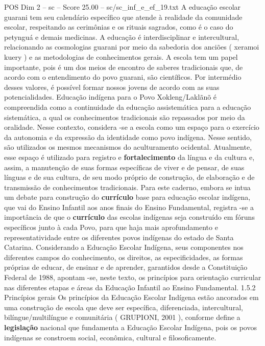 \begin{textsample}{POS Dim 2 – sc – Score 25.00 – sc/sc\_inf\_e\_ef\_19.txt}
A educação escolar guarani tem seu calendário específico que atende à realidade da comunidade escolar, respeitando as cerimônias e os rituais sagrados, como é o caso do petynguá e demais medicinas.
A educação é interdisciplinar e intercultural, relacionando as cosmologias guarani por meio da sabedoria dos anciões ( xeramoi kuery ) e as metodologias de conhecimentos gerais.
A escola tem um papel importante, pois é um dos meios de encontro de saberes tradicionais que, de acordo com o entendimento do povo guarani, são científicos.
Por intermédio desses valores, é possível formar nossos jovens de acordo com as suas potencialidades.
Educação indígena para o Povo Xokleng/Laklãnõ é compreendida como a continuidade da educação assistemática para a educação sistemática, a qual os conhecimentos tradicionais são repassados por meio da oralidade.
Nesse contexto, considera -se a escola como um espaço para o exercício da autonomia e da expressão da identidade como povo indígena.
Nesse sentido, são utilizados os mesmos mecanismos do aculturamento ocidental.
Atualmente, esse espaço é utilizado para registro e \textbf{fortalecimento} da língua e da cultura e, assim, a manutenção de suas formas específicas de viver e de pensar, de suas línguas e de sua cultura, de seu modo próprio de construção, de elaboração e de transmissão de conhecimentos tradicionais.
Para este caderno, embora se intua um debate para construção do \textbf{currículo} base para educação escolar indígena, que vai do Ensino Infantil aos anos finais do Ensino Fundamental, registra -se a importância de que o \textbf{currículo} das escolas indígenas seja construído em fóruns específicos junto à cada Povo, para que haja mais aprofundamento e representatividade entre os diferentes povos indígenas do estado de Santa Catarina.
Considerando a Educação Escolar Indígena, seus componentes nos diferentes campos do conhecimento, os direitos, as especificidades, as formas próprias de educar, de ensinar e de aprender, garantidos desde a Constituição Federal de 1988, apontam -se, neste texto, os princípios para orientação curricular nas diferentes etapas e áreas da Educação Infantil ao Ensino Fundamental. 1.5.2 Princípios gerais Os princípios da Educação Escolar Indígena estão ancorados em uma construção de escola que deve ser específica, diferenciada, intercultural, bilíngue/multilíngue e comunitária ( GRUPIONI, 2001 ), conforme define a \textbf{legislação} nacional que fundamenta a Educação Escolar Indígena, pois os povos indígenas se constroem social, econômica, cultural e filosoficamente.

\end{textsample}
